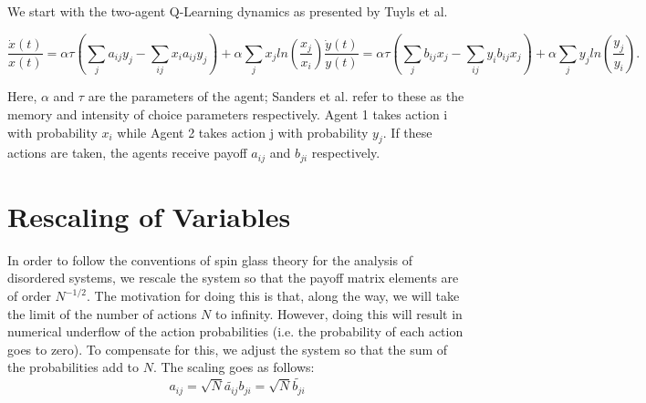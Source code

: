 \documentclass[.../main.tex]{subfiles}
\begin{document}
	We start with the two-agent Q-Learning dynamics as presented by Tuyls et al.

	\begin{subequations}
	\label{eqn::appEOM}
		\begin{equation}
			\frac{\dot{x}(t)}{x(t)} = \alpha \tau (\sum_{j} a_{ij} y_j - \sum_{i j} x_i a_{ij} y_j)
			+ \alpha \sum_j x_j ln(\frac{x_j}{x_i}) 
		\end{equation}
		\begin{equation}
			\frac{\dot{y}(t)}{y(t)} = \alpha \tau (\sum_{j} b_{ij} x_j - \sum_{i j} y_i b_{ij} x_j)
			+ \alpha \sum_j y_j ln(\frac{y_j}{y_i}).
		\end{equation}
	\end{subequations}

	Here, $\alpha$ and $\tau$ are the parameters of the agent; Sanders et al. refer to these as the memory and intensity of choice parameters respectively. Agent 1 takes action i with probability $x_i$ while Agent 2 takes action j with probability $y_j$. If these actions are taken, the agents receive payoff $a_{ij}$ and $b_{ji}$ respectively. 

	\section{Rescaling of Variables} %
	\label{sub:apprescaling_of_variables}
	
		In order to follow the conventions of spin glass
                theory for the analysis of disordered systems, we
                rescale the system so that the payoff matrix elements
                are of order $N^{-1/2}$. The motivation for doing this
                is that, along the way, we will take the limit of the
                number of actions $N$ to infinity. However, doing this
                will result in numerical underflow of the action
                probabilities (i.e. the probability of each action
                goes to zero). To compensate for this, we adjust the
                system so that the sum of the probabilities add to
                $N$. The scaling goes as follows:
%
	\begin{subequations}
		\begin{equation}
			a_{ij} = \sqrt{N} \tilde{a_{ij}}
		\end{equation}
		\begin{equation}
			b_{ji} = \sqrt{N} \tilde{b_{ji}}
		\end{equation}
	\end{subequations}
\end{document}
